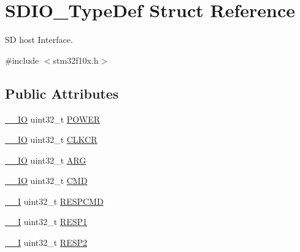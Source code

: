 \hypertarget{struct_s_d_i_o___type_def}{\section{S\-D\-I\-O\-\_\-\-Type\-Def Struct Reference}
\label{struct_s_d_i_o___type_def}
}


S\-D host Interface.  




{\ttfamily \#include $<$stm32f10x.\-h$>$}

\subsection*{Public Attributes}
\begin{DoxyCompactItemize}
\item 
\hyperlink{group___c_m_s_i_s__core__definitions_gaec43007d9998a0a0e01faede4133d6be}{\-\_\-\-\_\-\-I\-O} uint32\-\_\-t \hyperlink{struct_s_d_i_o___type_def_a7c156bc55f6d970a846a459d57a9e940}{P\-O\-W\-E\-R}
\item 
\hyperlink{group___c_m_s_i_s__core__definitions_gaec43007d9998a0a0e01faede4133d6be}{\-\_\-\-\_\-\-I\-O} uint32\-\_\-t \hyperlink{struct_s_d_i_o___type_def_aeb1e30ce2038628e45264f75e5e926bb}{C\-L\-K\-C\-R}
\item 
\hyperlink{group___c_m_s_i_s__core__definitions_gaec43007d9998a0a0e01faede4133d6be}{\-\_\-\-\_\-\-I\-O} uint32\-\_\-t \hyperlink{struct_s_d_i_o___type_def_a3e24392875e98cd09043e54a0990ab7a}{A\-R\-G}
\item 
\hyperlink{group___c_m_s_i_s__core__definitions_gaec43007d9998a0a0e01faede4133d6be}{\-\_\-\-\_\-\-I\-O} uint32\-\_\-t \hyperlink{struct_s_d_i_o___type_def_abbbdc3174e12dab21123d746d65f345d}{C\-M\-D}
\item 
\hyperlink{group___c_m_s_i_s__core__definitions_gaf63697ed9952cc71e1225efe205f6cd3}{\-\_\-\-\_\-\-I} uint32\-\_\-t \hyperlink{struct_s_d_i_o___type_def_a9d881ed6c2fdecf77e872bcc6b404774}{R\-E\-S\-P\-C\-M\-D}
\item 
\hyperlink{group___c_m_s_i_s__core__definitions_gaf63697ed9952cc71e1225efe205f6cd3}{\-\_\-\-\_\-\-I} uint32\-\_\-t \hyperlink{struct_s_d_i_o___type_def_a2b6f1ca5a5a50f8ef5417fe7be22553c}{R\-E\-S\-P1}
\item 
\hyperlink{group___c_m_s_i_s__core__definitions_gaf63697ed9952cc71e1225efe205f6cd3}{\-\_\-\-\_\-\-I} uint32\-\_\-t \hyperlink{struct_s_d_i_o___type_def_a9228c8a38c07c508373644220dd322f0}{R\-E\-S\-P2}
\item 

\end{DoxyCompactItemize}
